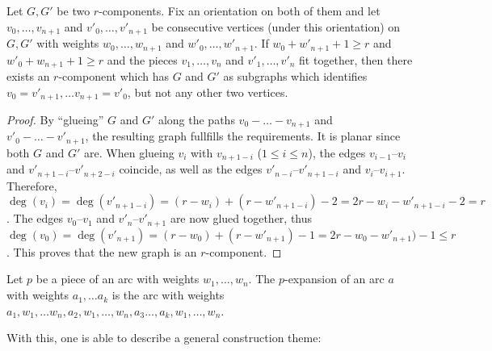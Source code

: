 \begin{lemma}
  Let $G, G'$ be two $r$-components. Fix an orientation on both of them and let $v_0, \dots, v_{n+1}$ and $v'_0, \dots, v'_{n+1}$ be consecutive vertices (under this orientation) on $G, G'$ with weights $w_0, \dots, w_{n+1}$ and $w'_0, \dots, w'_{n+1}$. If $w_0 + w'_{n+1} + 1 \geq r$ and $w'_0 + w_{n+1} + 1 \geq r$ and the pieces $v_1, \dots, v_n$ and $v'_1, \dots, v'_n$ fit together, then there exists an $r$-component which has $G$ and $G'$ as subgraphs which identifies $v_0 = v'_{n+1}, \dots v_{n+1} = v'_0$, but not any other two vertices.
  \begin{proof}
    By ``glueing'' $G$ and $G'$ along the paths $v_0 - \dots - v_{n+1}$ and $v'_0 - \dots - v'_{n+1}$, the resulting graph fullfills the requirements. It is planar since both $G$ and $G'$ are. When glueing $v_i$ with $v_{n+1-i}$ ($1 \leq i \leq n$), the edges $v_{i-1}$--$v_i$ and $v'_{n + 1 - i}$--$v'_{n + 2 - i}$ coincide, as well as the edges $v'_{n - i}$--$v'_{n + 1 - i}$ and $v_i$--$v_{i+1}$. Therefore, $\deg(v_i) = \deg(v'_{n+1-i}) = (r - w_i) + (r - w'_{n + 1 - i}) - 2 = 2r - w_i - w'_{n + 1 - i} - 2 = r$. The edges $v_0$--$v_1$ and $v'_n$--$v'_{n+1}$ are now glued together, thus $\deg(v_0) = \deg(v'_{n+1}) = (r - w_0) + (r - w'_{n+1}) - 1 = 2r - w_0 - w'_{n+1}) - 1 \leq r$. This proves that the new graph is an $r$-component.
  \end{proof}
\end{lemma}

\begin{definition}
  Let $p$ be a piece of an arc with weights $w_1, \dots, w_{n}$. The $p$-expansion of an arc $a$ with weights $a_1, \dots a_k$ is the arc with weights $a_1, w_1, \dots w_n, a_2, w_1, \dots, w_n, a_3 \dots, a_k, w_1, \dots, w_n$.
\end{definition}

With this, one is able to describe a general construction theme:

\begin{construction}
  
\end{construction}

